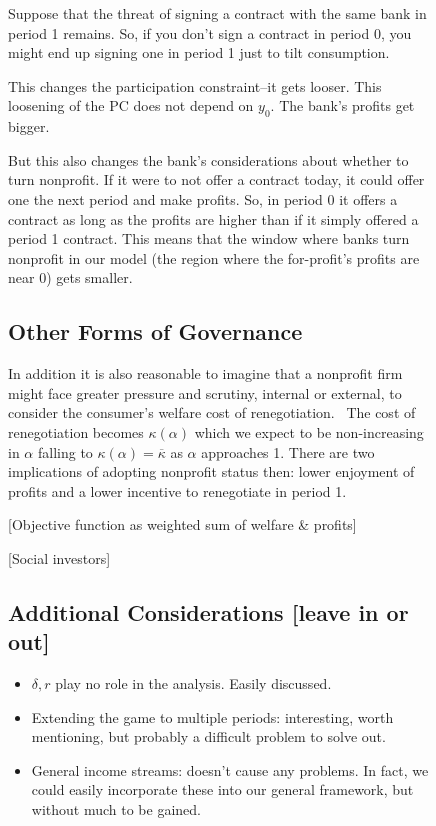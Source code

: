 \documentclass[11pt]{article}%
\begin{document}
\begin{figure}
{Suppose that the threat of signing a contract with the same bank in period 1
remains. So, if you don't sign a contract in period 0, you might end up
signing one in period 1 just to tilt consumption.

This changes the participation constraint--it gets looser. This loosening of
the PC does not depend on $y_{0}$. The bank's profits get bigger.

But this also changes the bank's considerations about whether to turn
nonprofit. If it were to not offer a contract today, it could offer one the
next period and make profits. So, in period 0 it offers a contract as long as
the profits are higher than if it simply offered a period 1 contract. This
means that the window where banks turn nonprofit in our model (the region
where the for-profit's profits are near 0) gets smaller.

\subsection{Other Forms of Governance}

In addition it is also reasonable to imagine that a nonprofit firm might face
greater pressure and scrutiny, internal or external, to consider the
consumer's welfare cost of renegotiation. \ The cost of renegotiation becomes
$\kappa(\alpha)$ which we expect to be non-increasing in $\alpha$ falling to
$\kappa(\alpha)=\overline{\kappa}$ as $\alpha$ approaches 1. There are two
implications of adopting nonprofit status then: lower enjoyment of profits and
a lower incentive to renegotiate in period 1.

[Objective function as weighted sum of welfare \& profits]

[Social investors]

\subsection{Additional Considerations [leave in or out]}

\begin{itemize}
\item $\delta,r$ play no role in the analysis. Easily discussed.

\item Extending the game to multiple periods: interesting, worth mentioning,
but probably a difficult problem to solve out.

\item General income streams: doesn't cause any problems. In fact, we could
easily incorporate these into our general framework, but without much to be gained.
\end{itemize}

}
\end{figure}
\end{document}
